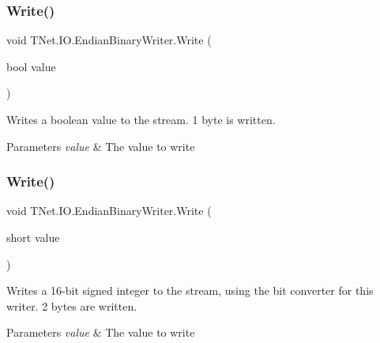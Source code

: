 \subsubsection{\texorpdfstring{Write()}{Write()}\hspace{0.1cm}{\footnotesize\ttfamily [1/17]}}
{\footnotesize\ttfamily void T\+Net.\+I\+O.\+Endian\+Binary\+Writer.\+Write (\begin{DoxyParamCaption}\item[{bool}]{value }\end{DoxyParamCaption})}



Writes a boolean value to the stream. 1 byte is written. 


\begin{DoxyParams}{Parameters}
{\em value} & The value to write\\
\hline
\end{DoxyParams}
\mbox{\label{class_t_net_1_1_i_o_1_1_endian_binary_writer_a9582cfc803bd67c7b183d7c8c139b033}} 
\subsubsection{\texorpdfstring{Write()}{Write()}\hspace{0.1cm}{\footnotesize\ttfamily [2/17]}}
{\footnotesize\ttfamily void T\+Net.\+I\+O.\+Endian\+Binary\+Writer.\+Write (\begin{DoxyParamCaption}\item[{short}]{value }\end{DoxyParamCaption})}



Writes a 16-\/bit signed integer to the stream, using the bit converter for this writer. 2 bytes are written. 


\begin{DoxyParams}{Parameters}
{\em value} & The value to write\\
\hline
\end{DoxyParams}
\mbox{\label{class_t_net_1_1_i_o_1_1_endian_binary_writer_aed3d83ac90ac9124864072acb22e0833}} 

